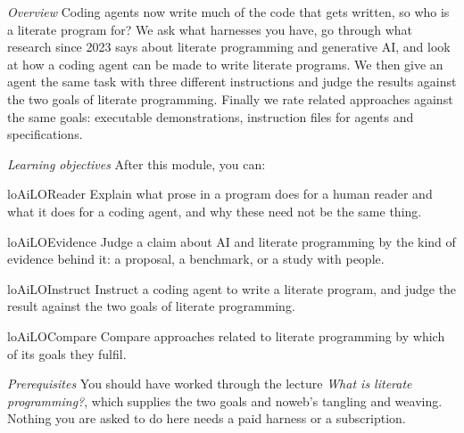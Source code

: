 
\emph{Overview}
Coding agents now write much of the code that gets written, so who is a
literate program for?
We ask what harnesses you have, go through what research since 2023 says about
literate programming and generative AI, and look at how a coding agent can be
made to write literate programs.
We then give an agent the same task with three different instructions and judge
the results against the two goals of literate programming.
Finally we rate related approaches against the same goals: executable
demonstrations, instruction files for agents and specifications.

\emph{Learning objectives}
After this module, you can:
\begin{restatable}{lo}{AiLOReader}\label{AiLOReader}%
  Explain what prose in a program does for a human reader and what it does for
  a coding agent, and why these need not be the same thing.
\end{restatable}
\begin{restatable}{lo}{AiLOEvidence}\label{AiLOEvidence}%
  Judge a claim about AI and literate programming by the kind of evidence
  behind it: a proposal, a benchmark, or a study with people.
\end{restatable}
\begin{restatable}{lo}{AiLOInstruct}\label{AiLOInstruct}%
  Instruct a coding agent to write a literate program, and judge the result
  against the two goals of literate programming.
\end{restatable}
\begin{restatable}{lo}{AiLOCompare}\label{AiLOCompare}%
  Compare approaches related to literate programming by which of its goals they
  fulfil.
\end{restatable}

\emph{Prerequisites}
You should have worked through the lecture \emph{What is literate
programming?}, which supplies the two goals and noweb's tangling and weaving.
Nothing you are asked to do here needs a paid harness or a subscription.
